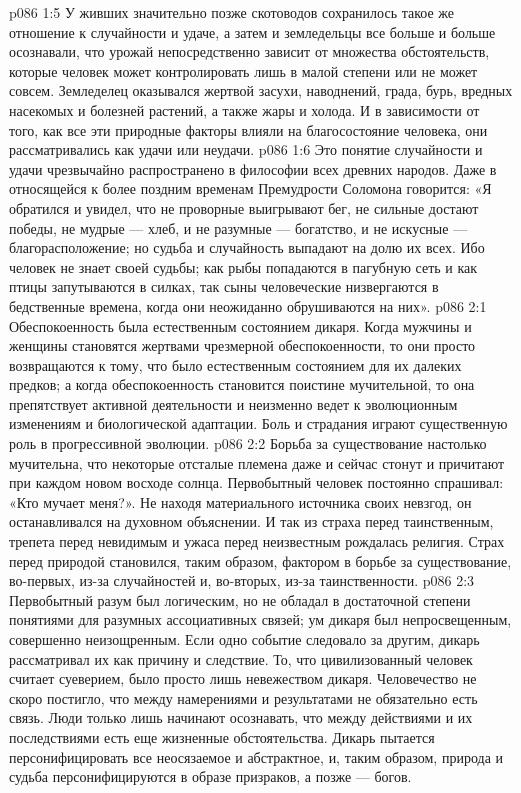 \vs p086 1:5 У живших значительно позже скотоводов сохранилось такое же отношение к случайности и удаче, а затем и земледельцы все больше и больше осознавали, что урожай непосредственно зависит от множества обстоятельств, которые человек может контролировать лишь в малой степени или не может совсем. Земледелец оказывался жертвой засухи, наводнений, града, бурь, вредных насекомых и болезней растений, а также жары и холода. И в зависимости от того, как все эти природные факторы влияли на благосостояние человека, они рассматривались как удачи или неудачи.
\vs p086 1:6 Это понятие случайности и удачи чрезвычайно распространено в философии всех древних народов. Даже в относящейся к более поздним временам Премудрости Соломона говорится: «Я обратился и увидел, что не проворные выигрывают бег, не сильные достают победы, не мудрые --- хлеб, и не разумные --- богатство, и не искусные --- благорасположение; но судьба и случайность выпадают на долю их всех. Ибо человек не знает своей судьбы; как рыбы попадаются в пагубную сеть и как птицы запутываются в силках, так сыны человеческие низвергаются в бедственные времена, когда они неожиданно обрушиваются на них».
\vs p086 2:1 Обеспокоенность была естественным состоянием дикаря. Когда мужчины и женщины становятся жертвами чрезмерной обеспокоенности, то они просто возвращаются к тому, что было естественным состоянием для их далеких предков; а когда обеспокоенность становится поистине мучительной, то она препятствует активной деятельности и неизменно ведет к эволюционным изменениям и биологической адаптации. Боль и страдания играют существенную роль в прогрессивной эволюции.
\vs p086 2:2 Борьба за существование настолько мучительна, что некоторые отсталые племена даже и сейчас стонут и причитают при каждом новом восходе солнца. Первобытный человек постоянно спрашивал: «Кто мучает меня?». Не находя материального источника своих невзгод, он останавливался на духовном объяснении. И так из страха перед таинственным, трепета перед невидимым и ужаса перед неизвестным рождалась религия. Страх перед природой становился, таким образом, фактором в борьбе за существование, во\hyp{}первых, из\hyp{}за случайностей и, во\hyp{}вторых, из\hyp{}за таинственности.
\vs p086 2:3 \pc Первобытный разум был логическим, но не обладал в достаточной степени понятиями для разумных ассоциативных связей; ум дикаря был непросвещенным, совершенно неизощренным. Если одно событие следовало за другим, дикарь рассматривал их как причину и следствие. То, что цивилизованный человек считает суеверием, было просто лишь невежеством дикаря. Человечество не скоро постигло, что между намерениями и результатами не обязательно есть связь. Люди только лишь начинают осознавать, что между действиями и их последствиями есть еще жизненные обстоятельства. Дикарь пытается персонифицировать все неосязаемое и абстрактное, и, таким образом, природа и судьба персонифицируются в образе призраков, а позже --- богов.
